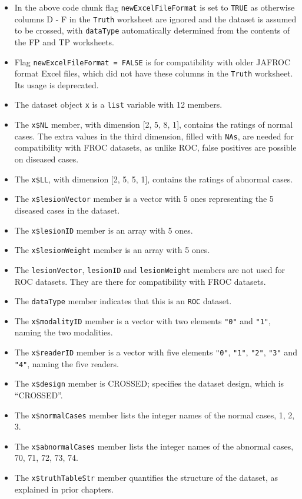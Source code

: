 \documentclass[
]{book}
\providecommand{\tightlist}{%
  \setlength{\itemsep}{0pt}\setlength{\parskip}{0pt}}
\begin{document}
\begin{itemize}
\tightlist
\item
  In the above code chunk flag \texttt{newExcelFileFormat} is set to \texttt{TRUE} as otherwise columns D - F in the \texttt{Truth} worksheet are ignored and the dataset is assumed to be crossed, with \texttt{dataType} automatically determined from the contents of the FP and TP worksheets.
\item
  Flag \texttt{newExcelFileFormat\ =\ FALSE} is for compatibility with older JAFROC format Excel files, which did not have these columns in the \texttt{Truth} worksheet. Its usage is deprecated.
\item
  The dataset object \texttt{x} is a \texttt{list} variable with 12 members.
\item
  The \texttt{x\$NL} member, with dimension {[}2, 5, 8, 1{]}, contains the ratings of normal cases. The extra values in the third dimension, filled with \texttt{NAs}, are needed for compatibility with FROC datasets, as unlike ROC, false positives are possible on diseased cases.
\item
  The \texttt{x\$LL}, with dimension {[}2, 5, 5, 1{]}, contains the ratings of abnormal cases.
\item
  The \texttt{x\$lesionVector} member is a vector with 5 ones representing the 5 diseased cases in the dataset.
\item
  The \texttt{x\$lesionID} member is an array with 5 ones.
\item
  The \texttt{x\$lesionWeight} member is an array with 5 ones.
\item
  The \texttt{lesionVector}, \texttt{lesionID} and \texttt{lesionWeight} members are not used for ROC datasets. They are there for compatibility with FROC datasets.
\item
  The \texttt{dataType} member indicates that this is an \texttt{ROC} dataset.
\item
  The \texttt{x\$modalityID} member is a vector with two elements \texttt{"0"} and \texttt{"1"}, naming the two modalities.
\item
  The \texttt{x\$readerID} member is a vector with five elements \texttt{"0"}, \texttt{"1"}, \texttt{"2"}, \texttt{"3"} and \texttt{"4"}, naming the five readers.
\item
  The \texttt{x\$design} member is CROSSED; specifies the dataset design, which is ``CROSSED''.
\item
  The \texttt{x\$normalCases} member lists the integer names of the normal cases, 1, 2, 3.
\item
  The \texttt{x\$abnormalCases} member lists the integer names of the abnormal cases, 70, 71, 72, 73, 74.
\item
  The \texttt{x\$truthTableStr} member quantifies the structure of the dataset, as explained in prior chapters.
\end{itemize}
\end{document}
